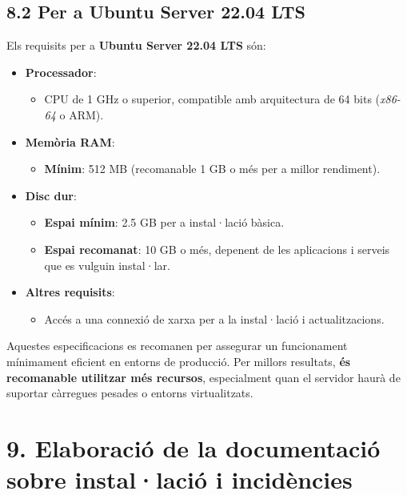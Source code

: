 \documentclass[
  a4paper,
]{article}
\providecommand{\tightlist}{%
  \setlength{\itemsep}{0pt}\setlength{\parskip}{0pt}}
\begin{document}
\subsection{8.2 Per a Ubuntu Server 22.04
LTS}\label{per-a-ubuntu-server-22.04-lts}

Els requisits per a \textbf{Ubuntu Server 22.04 LTS} són:

\begin{itemize}
\tightlist
\item
  \textbf{Processador}:

  \begin{itemize}
  \tightlist
  \item
    CPU de 1 GHz o superior, compatible amb arquitectura de 64 bits
    (\emph{x86-64} o ARM).
  \end{itemize}
\item
  \textbf{Memòria RAM}:

  \begin{itemize}
  \tightlist
  \item
    \textbf{Mínim}: 512 MB (recomanable 1 GB o més per a millor
    rendiment).
  \end{itemize}
\item
  \textbf{Disc dur}:

  \begin{itemize}
  \tightlist
  \item
    \textbf{Espai mínim}: 2.5 GB per a instal·lació bàsica.
  \item
    \textbf{Espai recomanat}: 10 GB o més, depenent de les aplicacions i
    serveis que es vulguin instal·lar.
  \end{itemize}
\item
  \textbf{Altres requisits}:

  \begin{itemize}
  \tightlist
  \item
    Accés a una connexió de xarxa per a la instal·lació i
    actualitzacions.
  \end{itemize}
\end{itemize}

Aquestes especificacions es recomanen per assegurar un funcionament
mínimament eficient en entorns de producció. Per millors resultats,
\textbf{és recomanable utilitzar més recursos}, especialment quan el
servidor haurà de suportar càrregues pesades o entorns virtualitzats.

\section{9. Elaboració de la documentació sobre instal·lació i
incidències}\label{elaboraciuxf3-de-la-documentaciuxf3-sobre-installaciuxf3-i-inciduxe8ncies}
\end{document}
